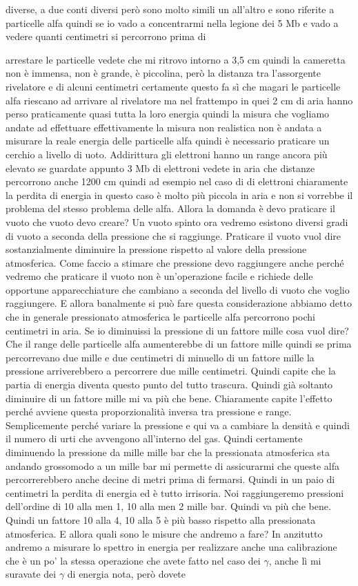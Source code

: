 {diverse, a due conti diversi però sono molto simili un all'altro e sono riferite a particelle alfa quindi se io vado a concentrarmi nella legione dei 5 Mb e vado a vedere quanti centimetri si percorrono prima di 

arrestare le particelle vedete che mi ritrovo intorno a 3,5 cm quindi la cameretta non è immensa, non è grande, è piccolina, però la distanza tra l'assorgente rivelatore e di alcuni centimetri certamente questo fa sì che magari le particelle alfa riescano ad arrivare al rivelatore ma nel frattempo in quei 2 cm di aria hanno perso praticamente quasi tutta la loro energia quindi la misura che vogliamo andate ad effettuare effettivamente la misura non realistica non è andata a misurare la reale energia delle particelle alfa quindi è necessario praticare un cerchio a livello di uoto. Addirittura gli elettroni hanno un range ancora più elevato se guardate appunto 3 Mb di elettroni vedete in aria che distanze percorrono anche 1200 cm quindi ad esempio nel caso di di elettroni chiaramente la perdita di energia in questo caso è molto più piccola in aria e non si vorrebbe il problema del stesso problema delle alfa. Allora la domanda è devo praticare il vuoto che vuoto devo creare? Un vuoto spinto ora vedremo esistono diversi gradi di vuoto a seconda della pressione che si raggiunge. Praticare il vuoto vuol dire sostanzialmente diminuire la pressione rispetto al valore della pressione atmosferica. Come faccio a stimare che pressione devo raggiungere anche perché vedremo che praticare il vuoto non è un'operazione facile e richiede delle opportune apparecchiature che cambiano a seconda del livello di vuoto che voglio raggiungere. E allora banalmente si può fare questa considerazione abbiamo detto che in generale pressionato atmosferica le particelle alfa percorrono pochi centimetri in aria. Se io diminuissi la pressione di un fattore mille cosa vuol dire? Che il range delle particelle alfa aumenterebbe di un fattore mille quindi se prima percorrevano due mille e due centimetri di minuello di un fattore mille la pressione arriverebbero a percorrere due mille centimetri. Quindi capite che la partia di energia diventa questo punto del tutto trascura. Quindi già soltanto diminuire di un fattore mille mi va più che bene. Chiaramente capite l'effetto perché avviene questa proporzionalità inversa tra pressione e range. Semplicemente perché variare la pressione e qui va a cambiare la densità e quindi il numero di urti che avvengono all'interno del gas. Quindi certamente diminuendo la pressione da mille mille bar che la pressionata atmosferica sta andando grossomodo a un mille bar mi permette di assicurarmi che queste alfa percorrerebbero anche decine di metri prima di fermarsi. Quindi in un paio di centimetri la perdita di energia ed è tutto irrisoria. Noi raggiungeremo pressioni dell'ordine di 10 alla men 1, 10 alla men 2 mille bar. Quindi va più che bene. Quindi un fattore 10 alla 4, 10 alla 5 è più basso rispetto alla pressionata atmosferica. E allora quali sono le misure che andremo a fare? In anzitutto andremo a misurare lo spettro in energia per realizzare anche una calibrazione che è un po' la stessa operazione che avete fatto nel caso dei $\gamma$, anche lì mi suravate dei $\gamma$ di energia nota, però dovete }
